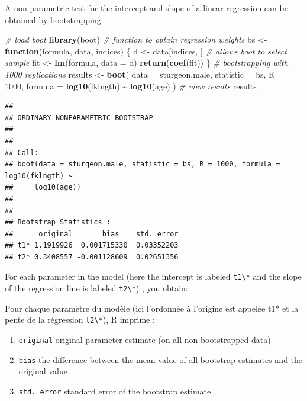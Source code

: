 \documentclass[
  12pt,
]{book}
\newenvironment{Shaded}{\begin{snugshade}}{\end{snugshade}}
\newcommand{\CommentTok}[1]{\textcolor[rgb]{0.56,0.35,0.01}{\textit{#1}}}
\newcommand{\ControlFlowTok}[1]{\textcolor[rgb]{0.13,0.29,0.53}{\textbf{#1}}}
\newcommand{\DataTypeTok}[1]{\textcolor[rgb]{0.13,0.29,0.53}{#1}}
\newcommand{\DecValTok}[1]{\textcolor[rgb]{0.00,0.00,0.81}{#1}}
\newcommand{\KeywordTok}[1]{\textcolor[rgb]{0.13,0.29,0.53}{\textbf{#1}}}
\newcommand{\NormalTok}[1]{#1}
\newcommand{\OperatorTok}[1]{\textcolor[rgb]{0.81,0.36,0.00}{\textbf{#1}}}
\newcommand{\StringTok}[1]{\textcolor[rgb]{0.31,0.60,0.02}{#1}}
\providecommand{\tightlist}{%
  \setlength{\itemsep}{0pt}\setlength{\parskip}{0pt}}
\begin{document}
A non-parametric test for the intercept and slope of a linear regression can be obtained by bootstrapping.

\begin{Shaded}
\begin{Highlighting}[]
\CommentTok{\# load boot}
\KeywordTok{library}\NormalTok{(boot)}
\CommentTok{\# function to obtain regression weights}
\NormalTok{bs \textless{}{-}}\StringTok{ }\ControlFlowTok{function}\NormalTok{(formula, data, indices) \{}
\NormalTok{  d \textless{}{-}}\StringTok{ }\NormalTok{data[indices, ] }\CommentTok{\# allows boot to select sample}
\NormalTok{  fit \textless{}{-}}\StringTok{ }\KeywordTok{lm}\NormalTok{(formula, }\DataTypeTok{data =}\NormalTok{ d)}
  \KeywordTok{return}\NormalTok{(}\KeywordTok{coef}\NormalTok{(fit))}
\NormalTok{\}}
\CommentTok{\# bootstrapping with 1000 replications}
\NormalTok{results \textless{}{-}}\StringTok{ }\KeywordTok{boot}\NormalTok{(}
  \DataTypeTok{data =}\NormalTok{ sturgeon.male,}
  \DataTypeTok{statistic =}\NormalTok{ bs,}
  \DataTypeTok{R =} \DecValTok{1000}\NormalTok{, }\DataTypeTok{formula =} \KeywordTok{log10}\NormalTok{(fklngth) }\OperatorTok{\textasciitilde{}}\StringTok{ }\KeywordTok{log10}\NormalTok{(age)}
\NormalTok{)}
\CommentTok{\# view results}
\NormalTok{results}
\end{Highlighting}
\end{Shaded}

\begin{verbatim}
## 
## ORDINARY NONPARAMETRIC BOOTSTRAP
## 
## 
## Call:
## boot(data = sturgeon.male, statistic = bs, R = 1000, formula = log10(fklngth) ~ 
##     log10(age))
## 
## 
## Bootstrap Statistics :
##      original       bias    std. error
## t1* 1.1919926  0.001715330  0.03352203
## t2* 0.3408557 -0.001128609  0.02651356
\end{verbatim}

For each parameter in the model (here the intercept is labeled \texttt{t1\textbackslash{}*} and the slope of the regression line is labeled \texttt{t2\textbackslash{}*}) , you obtain:

Pour chaque paramètre du modèle (ici l'ordonnée à l'origine est
appelée t1* et la pente de la régression \texttt{t2\textbackslash{}*}), R imprime :

\begin{enumerate}
\def\labelenumi{\arabic{enumi}.}
\tightlist
\item
  \texttt{original} original parameter estimate (on all non-bootstrapped data)
\item
  \texttt{bias} the difference between the mean value of all bootstrap estimates and the original value
\item
  \texttt{std.\ error} standard error of the bootstrap estimate
\end{enumerate}
\end{document}
